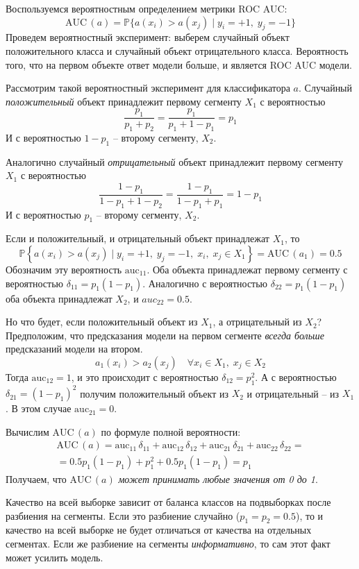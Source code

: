 \documentclass[12pt,a4paper]{article}
\begin{document}
\begin{esSolution}
	Воспользуемся вероятностным определением метрики ROC AUC:
	$$
		\text{AUC}\,(a) = \mathbb P \big \{ a(x_i) > a(x_j)\; |\; y_i = +1,\; y_j = -1 \big \}
	$$
	Проведем вероятностный эксперимент: выберем случайный объект положительного класса и случайный объект отрицательного класса.
	Вероятность того, что на первом объекте ответ модели больше, и является ROC AUC модели.
	
	Рассмотрим такой вероятностный эксперимент для классификатора $ a $.
	Случайный \textit{положительный} объект принадлежит первому сегменту $ X_1 $ с вероятностью
	$$
		\dfrac{p_1}{p_1 + p_2} = \dfrac{p_1}{p_1 + 1 - p_1} = p_1
	$$
	И с вероятностью $ 1 - p_1 $ – второму сегменту, $ X_2 $.
	
	Аналогично случайный \textit{отрицательный} объект принадлежит первому сегменту $ X_1 $ с вероятностью 
	$$
		\dfrac{1 - p_1}{1 - p_1 + 1 - p_2} = \dfrac{1 - p_1}{1 - p_1 +  p_1} = 1 - p_1
	$$
	И с вероятностью $ p_1 $ – второму сегменту, $ X_2 $.
	
	Если и положительный, и отрицательный объект принадлежат $ X_1 $, то
	$$
		\mathbb{P} \left\{ a(x_i) > a(x_j)\; |\; y_i = +1,\; y_j = -1,\; x_i,\; x_j \in X_1  \right\}
		=
		\text{AUC}\,(a_1) = 0.5
	$$
	Обозначим эту вероятность $ \text{auc}_{11} $.
	Оба объекта принадлежат первому сегменту с вероятностью $ \delta_{11} = p_1 (1 - p_1) $.
	Аналогично с вероятностью $ \delta_{22} = p_1 (1 - p_1) $ оба объекта принадлежат $ X_2 $, и $ auc_{22}=0.5 $.
	
	Но что будет, если положительный объект из $ X_1 $, а отрицательный из $ X_2 $?
	Предположим, что предсказания модели на первом сегменте \textit{всегда больше} предсказаний модели на втором.
	$$
		a_1(x_i) > a_2(x_j)\quad \forall x_i \in X_1,\; x_j \in X_2
	$$
	Тогда $ \text{auc}_{12} = 1 $, и это происходит с вероятностью $ \delta_{12} = p_1 ^ 2 $.
	А с вероятностью $ \delta_{21} = (1 - p_1) ^ 2$ получим положительный объект из $ X_2 $ и отрицательный – из $ X_1 $.
	В этом случае $ \text{auc}_{21} = 0 $.
	
	Вычислим $ \text{AUC}\,(a) $ по формуле полной вероятности:
	\begin{multline*}
		\text{AUC}\,(a)
		=
		\text{auc}_{11}\,\delta_{11} + \text{auc}_{12}\,\delta_{12} + \text{auc}_{21}\,\delta_{21} + \text{auc}_{22}\,\delta_{22}
		= \\ =
		0.5 p_1(1 - p_1) + p_1^2 + 0.5 p_1(1 - p_1)
		=
		p_1
	\end{multline*}
	Получаем, что $ \text{AUC}\,(a) $ \textit{может принимать любые значения от 0 до 1}.
	
	Качество на всей выборке зависит от баланса классов на подвыборках после разбиения на сегменты.
	Если это разбиение случайно ($p_1 = p_2 = 0.5$), то и качество на всей выборке не будет отличаться от качества на отдельных сегментах.
	Если же разбиение на сегменты \textit{информативно}, то сам этот факт может усилить модель.
\end{esSolution}
\end{document}
